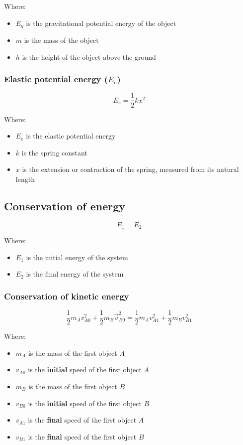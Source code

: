 \documentclass[11pt]{article}
\begin{document}
Where:
\begin{itemize}
\item \(E_g\) is the gravitational potential energy of the object
\item \(m\) is the mass of the object
\item \(h\) is the height of the object above the ground
\end{itemize}

\subsubsection{Elastic potential energy (\(E_e\))}
\label{sec:org592ce8d}
\[E_e = \frac{1}{2} kx^2\]

Where:
\begin{itemize}
\item \(E_e\) is the elastic potential energy
\item \(k\) is the spring constant
\item \(x\) is the extension or contraction of the spring, measured from its natural length
\end{itemize}

\subsection{Conservation of energy}
\label{sec:orge98f03c}
\[E_1 = E_2\]

Where:
\begin{itemize}
\item \(E_1\) is the initial energy of the system
\item \(E_2\) is the final energy of the system
\end{itemize}

\subsubsection{Conservation of kinetic energy}
\label{sec:orgf306fea}
\[\frac{1}{2} m_A v_{A0}^2 + \frac{1}{2} m_B \vec{v}_{B0}^2 = \frac{1}{2} m_A v_{A1}^2 + \frac{1}{2} m_B v_{B1}^2\]

Where:
\begin{itemize}
\item \(m_A\) is the mass of the first object \(A\)
\item \(v_{A0}\) is the \textbf{initial} speed of the first object \(A\)
\item \(m_B\) is the mass of the first object \(B\)
\item \(v_{B0}\) is the \textbf{initial} speed of the first object \(B\)
\item \(v_{A1}\) is the \textbf{final} speed of the first object \(A\)
\item \(v_{B1}\) is the \textbf{final} speed of the first object \(B\)
\end{itemize}
\end{document}
